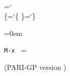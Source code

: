   \def\bye{\par\vfill\supereject
    \if a\abc \else\null\vfill\eject\fi
    \if a\abc \else\null\vfill\eject\fi
    \end}
\fi


\chardef\\=`\\
\chardef\{=`\{
\chardef\}=`\}

\hyphenation{}

\parindent 0pt
\parskip 0pt

\def\small{\smallfont\textfont2=\smallsy\baselineskip=.8\baselineskip}

\outer\def\newcolumn{\vfill\eject}

\outer{}

\outer{}

\outer{}

\newdimen\keyindent
\def\beginindentedkeys{\keyindent=1em}
\def\endindentedkeys{\keyindent=0em}
\endindentedkeys

\def\kbd#1{{\tt#1}\null} %

\newbox\libox
\setbox\libox\hbox{\kbd{M-x }}
\newdimen\liwidth
\liwidth=\wd\libox

\def\li#1#2{\leavevmode\hbox to \hsize{\hbox to .75\hsize
  {\hskip\keyindent\relax#1\hfil}%
  \hskip -\liwidth minus 1fil
  \kbd{#2}\hfil}}

\def\threecol#1#2#3{\hskip\keyindent\relax#1\hfil&\kbd{#2}\quad
  &\kbd{#3}\quad\cr}

\def\mod{\;\hbox{\rm mod}\;}
\def\expr{\hbox{\it expr}}
\def\seq{\hbox{\it seq}}
\def\args{\hbox{\it args}}
\def\file{\hbox{\it file}}
\def\QQ{\hbox{\bf Q}}
\def\MM{\hbox{\bf M}}
\def\ZZ{\hbox{\bf Z}}
\def\PP{\hbox{\bf P}}
\def\RR{\hbox{\bf R}}
\def\FF{\hbox{\bf F}}
\def\CC{\hbox{\bf C}}
\def\deg{\mathop{\rm deg}}
\def\bs{\char'134}
\def\pow{\^{}\hskip0pt}
\def\til{\raise-0.3em\hbox{\~{}}}
\def\typ#1{\kbd{t\_#1}}


\title{\TITLE}
\centerline{(PARI-GP version \PARIversion)}
